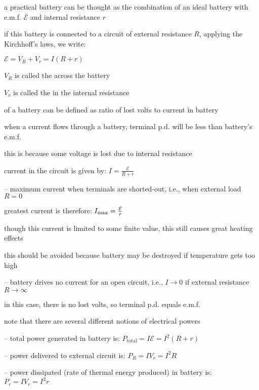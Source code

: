 a practical battery can be thought as the combination of an ideal battery with e.m.f. $\mathcal{E}$ and internal resistance $r$

if this battery is connected to a circuit of external resistance $R$, applying the Kirchhoff's laws, we write:

{
	\centering
	
	$\boxed{\mathcal{E} = V_R + V_r = I(R+r)}$
	
}

$V_R$ is called the  across the battery

$V_r$ is called the  in the internal resistance

\cmt {} of a battery can be defined as ratio of lost volts to current in battery

\cmt when a current flows through a battery, terminal p.d. will be less than battery's e.m.f.

this is because some voltage is lost due to internal resistance


\cmt current in the circuit is given by: $I = \frac{\mathcal{E}}{R+r}$

\begin{compactitem}
	\item[--] maximum current when terminals are shorted-out, i.e., when external load $R=0$
	
	greatest current is therefore: $I_{\text{max}} = \frac{\mathcal{E}}{r}$
	
	though this current is limited to some finite value, this still causes great heating effects
	
	this should be avoided because battery may be destroyed if temperature gets too high
	
	\item[--] battery drives no current for an open circuit, i.e., $I \to 0$ if external resistance $R \to \infty$
	
	in this case, there is no lost volts, so terminal p.d. equals e.m.f.
\end{compactitem}

\cmt note that there are several different notions of electrical powers

\begin{compactitem}
	\item[--] total power generated in battery is: $P_\text{total} = I\mathcal{E} = I^2 (R+r)$

	\item[--] power delivered to external circuit is: $P_R = I V_r = I^2 R$

	\item[--] power dissipated (rate of thermal energy produced) in battery is: $P_r = I V_r = I^2 r$
\end{compactitem}

